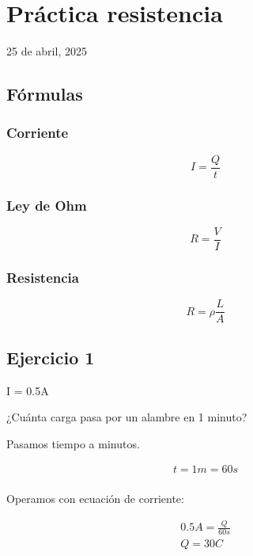 \section{Práctica resistencia}

25 de abril, 2025

\subsection{Fórmulas}

\subsubsection{Corriente}

\begin{equation}
    I = \frac{Q}{t}
\end{equation}

\subsubsection{Ley de Ohm}

\begin{equation}
    R = \frac{V}{I}
\end{equation}

\subsubsection{Resistencia}

\begin{equation}
    R = \rho\frac{L}{A}
\end{equation}

\subsection{Ejercicio 1}

I = 0.5A

¿Cuánta carga pasa por un alambre en 1 minuto?

Pasamos tiempo a minutos.

\begin{align*}
    t = 1 m = 60 s \\
\end{align*}

Operamos con ecuación de corriente:

\begin{align*}
    0.5A = \frac{Q}{60 s} \\
    \boxed{Q = 30 C}
\end{align*}

